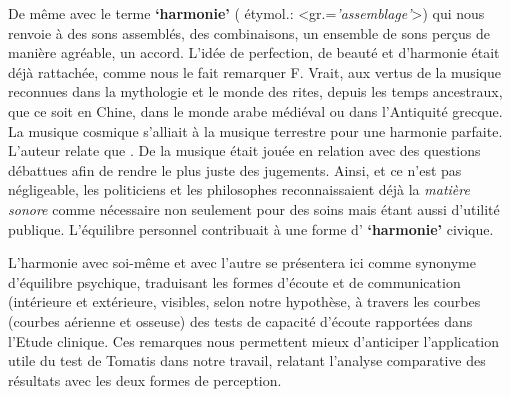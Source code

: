 De même avec le terme \textbf{`harmonie'} ( étymol.:
<gr.=\textit{'assemblage'}>) qui nous renvoie à
 des sons assemblés, des combinaisons, un ensemble de sons perçus de
 manière agréable, un accord. L'idée de perfection, de beauté et d'harmonie était déjà rattachée, comme 
 nous le fait remarquer F. Vrait, aux  vertus de la musique reconnues dans la mythologie et le
 monde des rites, depuis les temps ancestraux, que ce soit en Chine, dans le monde arabe
 médiéval ou dans l'Antiquité grecque. La musique cosmique s'alliait  à la musique terrestre pour une harmonie parfaite.
 L'auteur relate que  \autocite[80]{vrait_musicotherapie_2018}. De la musique était jouée en relation avec des questions débattues afin de rendre le plus juste des jugements.
Ainsi, et ce n'est pas négligeable, les  politiciens  et les
philosophes reconnaissaient déjà la \textit{matière sonore} comme nécessaire non seulement pour  des soins mais étant aussi d'utilité
publique.
 L'équilibre personnel contribuait à une forme d' \textbf{`harmonie'} civique.
 
 
L'harmonie avec soi-même et avec l'autre se présentera ici comme synonyme d'équilibre
psychique, traduisant les formes d'écoute et de communication (intérieure et
extérieure, visibles, selon notre hypothèse,
 à travers les courbes (courbes aérienne et osseuse) des tests de capacité d'écoute rapportées
dans l'Etude clinique.
Ces remarques nous permettent mieux d'anticiper
l'application utile du test de Tomatis dans notre travail, relatant l'analyse
comparative des résultats avec les deux formes de perception.


